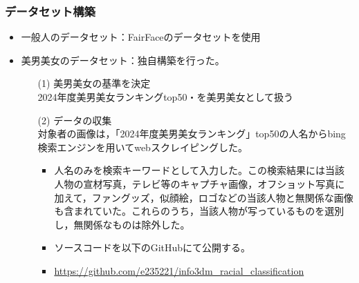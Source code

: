 \documentclass[a4paper,11pt,titlepage]{jsarticle}
\begin{document}
\subsubsection{データセット構築}
\begin{itemize}
    \item 一般人のデータセット：FairFaceのデータセットを使用
    \item 美男美女のデータセット：独自構築を行った。
        \begin{itemize}
            \item[(1)] 美男美女の基準を決定 \\
                2024年度美男美女ランキングtop50\cite{bidanshi}・\cite{bijoshi}を美男美女として扱う
            \item[(2)] データの収集 \\
                対象者の画像は，「2024年度美男美女ランキング」top50の人名からbing検索エンジンを用いてwebスクレイピングした。
                \begin{itemize}
                	\item	人名のみを検索キーワードとして入力した。この検索結果には当該人物の宣材写真，テレビ等のキャプチャ画像，オフショット写真に加えて，ファングッズ，似顔絵，ロゴなどの当該人物と無関係な画像も含まれていた。これらのうち，当該人物が写っているものを選別し，無関係なものは除外した。
                    \item ソースコードを以下のGitHubにて公開する。
                    \item \url{https://github.com/e235221/info3dm_racial_classification}
                \end{itemize}
        \end{itemize}
\end{itemize}
    
\end{document}
